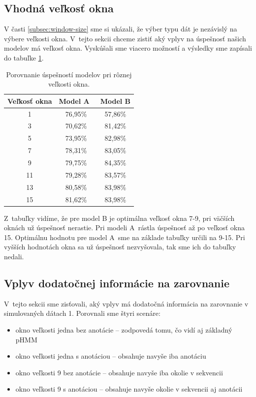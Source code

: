 \subsection{Vhodná veľkosť okna}

V časti \ref{subsec:window-size} sme si ukázali, že výber typu dát je nezávislý na výbere veľkosti okna. V~tejto sekcii chceme zistiť aký vplyv na úspešnosť našich modelov má veľkosť okna.
Vyskúšali sme viacero možností a výsledky sme zapísali do tabuľke \ref{tab:window-compare}.

\begin{table}[htp]
\centering
\begin{tabular}{ccc}
\toprule
Veľkosť okna & Model A~& Model B\\
\midrule
1 & 76,95\% & 57,86\%\\
3 & 70,62\% & 81,42\%\\
5 & 73,95\% & 82,98\%\\
7 & 78,31\% & 83,05\%\\
9 & 79,75\% & 84,35\%\\
11 & 79,28\% & 83,57\%\\
13 & 80,58\% & 83,98\%\\
15 & 81,62\% & 83,98\%\\
\bottomrule
\end{tabular}
\caption[Porovnanie úspešností pri rôznej veľkosti okna]{Porovnanie úspešností modelov pri rôznej veľkosti okna.}
\label{tab:window-compare}
\end{table}

Z~tabuľky vidíme, že pre model B je optimálna veľkosť okna 7-9, pri väčších oknách už úspešnosť nerastie. Pri modeli A~rástla úspešnosť až po veľkosť okna 15. Optimálnu hodnotu pre model A~sme na základe tabuľky určili na 9-15. Pri vyšších hodnotách okna sa už úspešnosť nezvyšovala, tak sme ich do tabuľky nedali.

\subsection{Vplyv dodatočnej informácie na zarovnanie}

V~tejto sekcii sme zisťovali, aký vplyv má dodatočná informácia na zarovnanie v simulovaných dátach 1. Porovnali sme štyri scenáre:
\begin{itemize}
    \item okno veľkosti jedna bez anotácie -- zodpovedá tomu, čo vidí aj základný pHMM
    \item okno veľkosti jedna s anotáciou -- obsahuje navyše iba anotáciu
    \item okno veľkosti 9 bez anotácie -- obsahuje navyše iba okolie v sekvencii
    \item okno veľkosti 9 s anotáciou -- obsahuje navyše okolie v sekvencii aj anotácii
\end{itemize}


